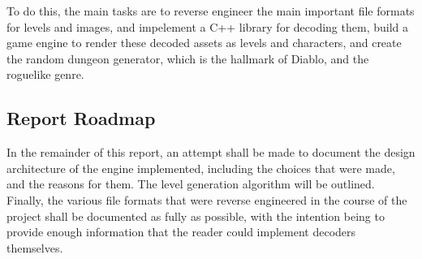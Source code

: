 	To do this, the main tasks are to reverse engineer the main important file formats for levels and images, and impelement a C++ library for decoding them, build a game engine to render these decoded assets as levels and characters, and create the random dungeon generator, which is the hallmark of Diablo, and the roguelike genre.
	
	\subsection{Report Roadmap}
	In the remainder of this report, an attempt shall be made to document the design architecture of the engine  implemented, including the choices that were made, and the reasons for them. The level generation algorithm will be outlined. Finally, the various file formats that were reverse engineered in the course of the project shall be documented as fully as possible, with the intention being to provide enough information that the reader could implement decoders themselves.